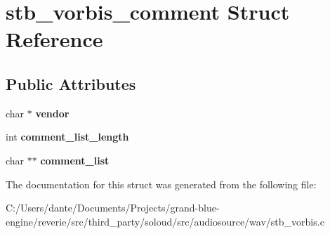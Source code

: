 \hypertarget{structstb__vorbis__comment}{}\section{stb\+\_\+vorbis\+\_\+comment Struct Reference}
\label{structstb__vorbis__comment}
\subsection*{Public Attributes}
\begin{DoxyCompactItemize}
\item 
\mbox{\label{structstb__vorbis__comment_a2d39c24fbb2ff48034f2c7b0be2b3a0e}} 
char $\ast$ {\bfseries vendor}
\item 
\mbox{\label{structstb__vorbis__comment_ab31b9294952f0f0e61469d07ab4057f0}} 
int {\bfseries comment\+\_\+list\+\_\+length}
\item 
\mbox{\label{structstb__vorbis__comment_ad1b41ced43bc70618a588a7a4bbca67e}} 
char $\ast$$\ast$ {\bfseries comment\+\_\+list}
\end{DoxyCompactItemize}


The documentation for this struct was generated from the following file\+:\begin{DoxyCompactItemize}
\item 
C\+:/\+Users/dante/\+Documents/\+Projects/grand-\/blue-\/engine/reverie/src/third\+\_\+party/soloud/src/audiosource/wav/stb\+\_\+vorbis.\+c\end{DoxyCompactItemize}
